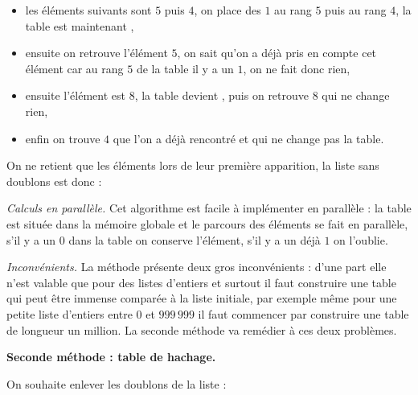\documentclass[11pt,class=report,crop=false]{standalone}
\begin{document}
\begin{activite}[Doublons]
\begin{itemize}
  \item les éléments suivants sont $5$ puis $4$, on place des $1$ au rang $5$ puis au rang $4$, la table est maintenant \ci{[0, 0, 0, 1, 1, 1, 0, 0, 0, 0]},
  
  \item ensuite on retrouve l'élément $5$, on sait qu'on a déjà pris en compte cet élément car au rang $5$ de la table il y a un $1$, on ne fait donc rien,
  
  \item ensuite l'élément est $8$, la table devient \ci{[0, 0, 0, 1, 1, 1, 0, 0, 1, 0]}, puis on retrouve $8$ qui ne change rien,
  
  \item enfin on trouve $4$ que l'on a déjà rencontré et qui ne change pas la table.  
\end{itemize}

On ne retient que les éléments lors de leur première apparition, la liste sans doublons est donc :
\mycenterline{\ci{[3, 5, 4, 8]}}

\bigskip

\emph{Calculs en parallèle.}
Cet algorithme est facile à implémenter en parallèle : la table est située dans la mémoire globale et le parcours des éléments se fait en parallèle, s'il y a un $0$ dans la table on conserve l'élément, s'il y a un déjà $1$ on l'oublie.

\bigskip

\emph{Inconvénients.}
La méthode présente deux gros inconvénients : d'une part elle n'est valable que pour des listes d'entiers et surtout il faut construire une table qui peut être immense comparée à la liste initiale, par exemple même pour une petite liste d'entiers  entre $0$ et $999\,999$ il faut commencer par construire une table de longueur un million. La seconde méthode va remédier à ces deux problèmes. 
 
 \bigskip
    
    
 \textbf{Seconde méthode : table de hachage.}
  
 On souhaite enlever les doublons de la liste :
 

\end{activite}
\end{document}
